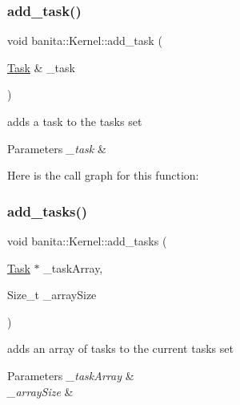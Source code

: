 \subsubsection{\texorpdfstring{add\_task()}{add\_task()}}
{\footnotesize\ttfamily void banita\+::\+Kernel\+::add\+\_\+task (\begin{DoxyParamCaption}\item[{\mbox{\hyperlink{classbanita_1_1_task}{Task}} \&}]{\+\_\+task }\end{DoxyParamCaption})\hspace{0.3cm}{\ttfamily [inline]}}



adds a task to the tasks set 


\begin{DoxyParams}{Parameters}
{\em \+\_\+task} & \\
\hline
\end{DoxyParams}
Here is the call graph for this function\+:
\mbox{\label{classbanita_1_1_kernel_a50aee62acd308f995925dab46106ef75}} 
\subsubsection{\texorpdfstring{add\_tasks()}{add\_tasks()}\hspace{0.1cm}{\footnotesize\ttfamily [1/2]}}
{\footnotesize\ttfamily void banita\+::\+Kernel\+::add\+\_\+tasks (\begin{DoxyParamCaption}\item[{\mbox{\hyperlink{classbanita_1_1_task}{Task}} $\ast$}]{\+\_\+task\+Array,  }\item[{Size\+\_\+t}]{\+\_\+array\+Size }\end{DoxyParamCaption})}



adds an array of tasks to the current tasks set 


\begin{DoxyParams}{Parameters}
{\em \+\_\+task\+Array} & \\
\hline
{\em \+\_\+array\+Size} & \\
\hline
\end{DoxyParams}
\mbox{\label{classbanita_1_1_kernel_aad63c1940db1247c8ba02fb84f78ec1f}} 
